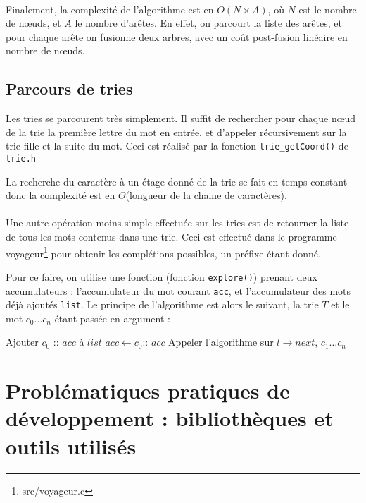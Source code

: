 \documentclass[a4paper]{article}
\begin{document}
\paragraph*{}
Finalement, la complexité de l'algorithme est en $O(N\times A)$, où $N$ est le nombre de nœuds, et $A$ le nombre d'arêtes. En effet, on parcourt la liste des arêtes, et pour chaque arête on fusionne deux arbres, avec un coût post-fusion linéaire en nombre de nœuds.
\subsection{Parcours de tries}

Les tries se parcourent très simplement. Il suffit de rechercher pour chaque nœud de la trie la première lettre du mot en entrée, et d'appeler récursivement sur la trie fille et la suite du mot. Ceci est réalisé par la fonction \texttt{trie\_getCoord()} de \texttt{trie.h}

La recherche du caractère à un étage donné de la trie se fait en temps constant donc la complexité est en $\Theta$(longueur de la chaine de caractères).

\paragraph*{}
Une autre opération moins simple effectuée sur les tries est de retourner la liste de tous les mots contenus dans une trie. Ceci est effectué dans le programme voyageur\footnote{src/voyageur.c} pour obtenir les complétions possibles, un préfixe étant donné.

Pour ce faire, on utilise une fonction (fonction \texttt{explore()}) prenant deux accumulateurs : l'accumulateur du mot courant \texttt{acc}, et l'accumulateur des mots déjà ajoutés \texttt{list}. Le principe de l'algorithme est alors le suivant, la trie $T$ et le mot $c_0 \ldots c_n$ étant passée en argument :

\begin{algorithm}[H]
   {
     {
      Ajouter $c_0$ :\!: $acc$ à $list$\;
    }
    $acc \leftarrow c_0$:\!: $acc$\;
    Appeler l'algorithme sur $l\rightarrow next$, $c_1 \ldots c_n$\;
  }
\end{algorithm}

\section{Problématiques pratiques de développement : bibliothèques et outils utilisés}
\end{document}
